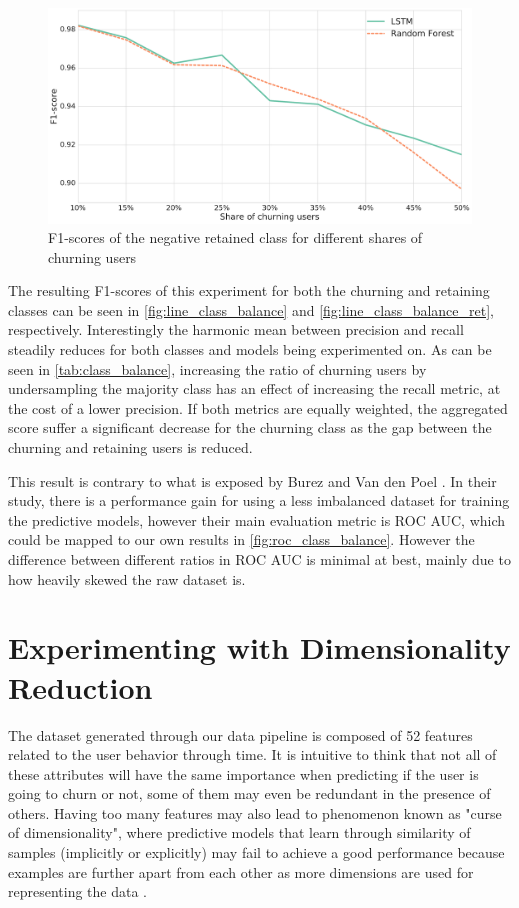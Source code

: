 \documentclass{kththesis}
\begin{document}
\begin{figure}
    \centering
    \includegraphics[width=1.0\textwidth,keepaspectratio]{figures/line_class_balance_retained.pdf}
    \caption{F1-scores of the negative retained class for different shares of churning users}
    \label{fig:line_class_balance_ret}
\end{figure}

The resulting F1-scores of this experiment for both the churning and retaining classes can be seen in \autoref{fig:line_class_balance} and \autoref{fig:line_class_balance_ret}, respectively. Interestingly the harmonic mean between precision and recall steadily reduces for both classes and models being experimented on. As can be seen in \autoref{tab:class_balance}, increasing the ratio of churning users by undersampling the majority class has an effect of increasing the recall metric, at the cost of a lower precision. If both metrics are equally weighted, the aggregated score suffer a significant decrease for the churning class as the gap between the churning and retaining users is reduced. 

This result is contrary to what is exposed by Burez and Van den Poel \citep{Burez2009}. In their study, there is a performance gain for using a less imbalanced dataset for training the predictive models,  however their main evaluation metric is ROC AUC, which could be mapped to our own results in \autoref{fig:roc_class_balance}. However the difference between different ratios in ROC AUC is minimal at best, mainly due to how heavily skewed the raw dataset is. 

\section{Experimenting with Dimensionality Reduction}

The dataset generated through our data pipeline is composed of 52 features related to the user behavior through time. It is intuitive to think that not all of these attributes will have the same importance when predicting if the user is going to churn or not, some of them may even be redundant in the presence of others. Having too many features may also lead to phenomenon known as "curse of dimensionality", where predictive models that learn through similarity of samples (implicitly or explicitly) may fail to achieve a good performance because examples are further apart from each other as more dimensions are used for representing the data \citep{domingos2012few}. 
\end{document}
